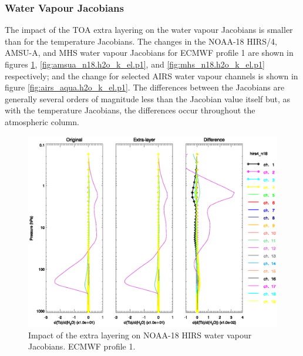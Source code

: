 \subsubsection{Water Vapour Jacobians}
The impact of the TOA extra layering on the water vapour Jacobians is smaller than for the temperature Jacobians. The changes in the NOAA-18 HIRS/4, AMSU-A, and MHS water vapour Jacobians for ECMWF profile 1 are shown in figures \ref{fig:hirs4_n18.h2o_k_el.p1}, \ref{fig:amsua_n18.h2o_k_el.p1}, and \ref{fig:mhs_n18.h2o_k_el.p1} respectively; and the change for selected AIRS water vapour channels is shown in figure \ref{fig:airs_aqua.h2o_k_el.p1}. The differences between the Jacobians are generally several orders of magnitude less than the Jacobian value itself but, as with the temperature Jacobians, the differences occur throughout the atmospheric column.
\begin{figure}[htp]
  \centering
  \includegraphics[scale=0.8]{graphics/hirs4_n18.h2o_k_el.p1.eps}
  \caption{Impact of the extra layering on NOAA-18 HIRS water vapour Jacobians. ECMWF profile 1.}
  \label{fig:hirs4_n18.h2o_k_el.p1}
\end{figure}
